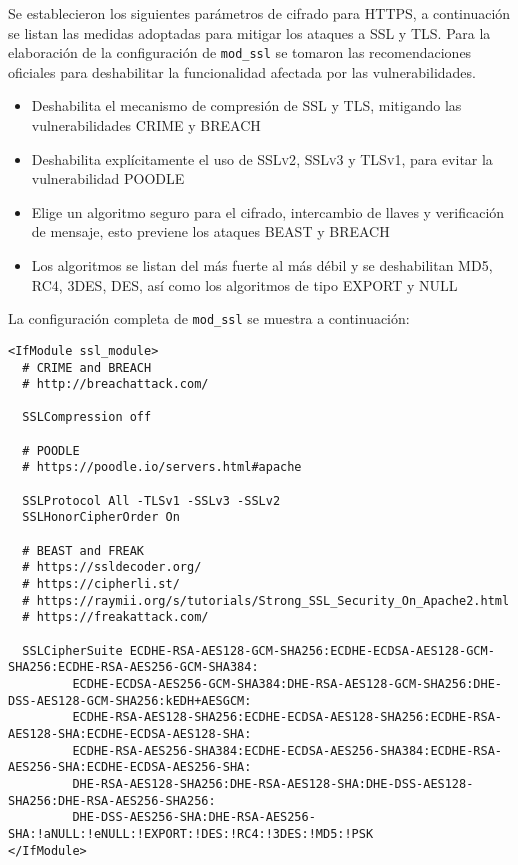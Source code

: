 Se establecieron los siguientes par\'{a}metros de cifrado para \textsc{HTTPS}, a continuaci\'{o}n se listan las medidas adoptadas para mitigar los ataques a \textsc{SSL} y \textsc{TLS}. Para la elaboraci\'{o}n de la configuraci\'{o}n de \texttt{mod\_ssl} se tomaron las recomendaciones oficiales para deshabilitar la funcionalidad afectada por las vulnerabilidades\cite{_ssl_????-2}\cite{goodin_crack_2012}\cite{_breach_????}\cite{_ssl-poodle.pdf_????}\cite{_heartbleed_????}\cite{_tracking_????}.

\begin{itemize}
  \item Deshabilita el mecanismo de compresi\'{o}n de \textsc{SSL} y \textsc{TLS}, mitigando las vulnerabilidades \textsc{CRIME}\cite{_crime_????} y \textsc{BREACH}\cite{_breach_????}
  \item Deshabilita expl\'{i}citamente el uso de \textsc{SSLv2}, \textsc{SSLv3} y \textsc{TLSv1}, para evitar la vulnerabilidad \textsc{POODLE}\cite{_poodle_????}
  \item Elige un algoritmo seguro para el cifrado, intercambio de llaves y verificaci\'{o}n de mensaje, esto previene los ataques \textsc{BEAST}\cite{_beast.pdf_????} y \textsc{BREACH}\cite{_breach_????}
  \item Los algoritmos se listan del m\'{a}s fuerte al m\'{a}s d\'{e}bil y se deshabilitan \textsc{MD5}, \textsc{RC4}, \textsc{3DES}, \textsc{DES}, as\'{i} como los algoritmos de tipo \textsc{EXPORT} y \textsc{NULL}
\end{itemize}

La configuraci\'{o}n completa de \texttt{mod\_ssl} se muestra a continuaci\'{o}n:

{
\scriptsize
\linespread{1}
\begin{verbatim}
<IfModule ssl_module>
  # CRIME and BREACH
  # http://breachattack.com/

  SSLCompression off

  # POODLE
  # https://poodle.io/servers.html#apache

  SSLProtocol All -TLSv1 -SSLv3 -SSLv2
  SSLHonorCipherOrder On

  # BEAST and FREAK
  # https://ssldecoder.org/
  # https://cipherli.st/
  # https://raymii.org/s/tutorials/Strong_SSL_Security_On_Apache2.html
  # https://freakattack.com/

  SSLCipherSuite ECDHE-RSA-AES128-GCM-SHA256:ECDHE-ECDSA-AES128-GCM-SHA256:ECDHE-RSA-AES256-GCM-SHA384:
         ECDHE-ECDSA-AES256-GCM-SHA384:DHE-RSA-AES128-GCM-SHA256:DHE-DSS-AES128-GCM-SHA256:kEDH+AESGCM:
         ECDHE-RSA-AES128-SHA256:ECDHE-ECDSA-AES128-SHA256:ECDHE-RSA-AES128-SHA:ECDHE-ECDSA-AES128-SHA:
         ECDHE-RSA-AES256-SHA384:ECDHE-ECDSA-AES256-SHA384:ECDHE-RSA-AES256-SHA:ECDHE-ECDSA-AES256-SHA:
         DHE-RSA-AES128-SHA256:DHE-RSA-AES128-SHA:DHE-DSS-AES128-SHA256:DHE-RSA-AES256-SHA256:
         DHE-DSS-AES256-SHA:DHE-RSA-AES256-SHA:!aNULL:!eNULL:!EXPORT:!DES:!RC4:!3DES:!MD5:!PSK
</IfModule>

\end{verbatim}
}

